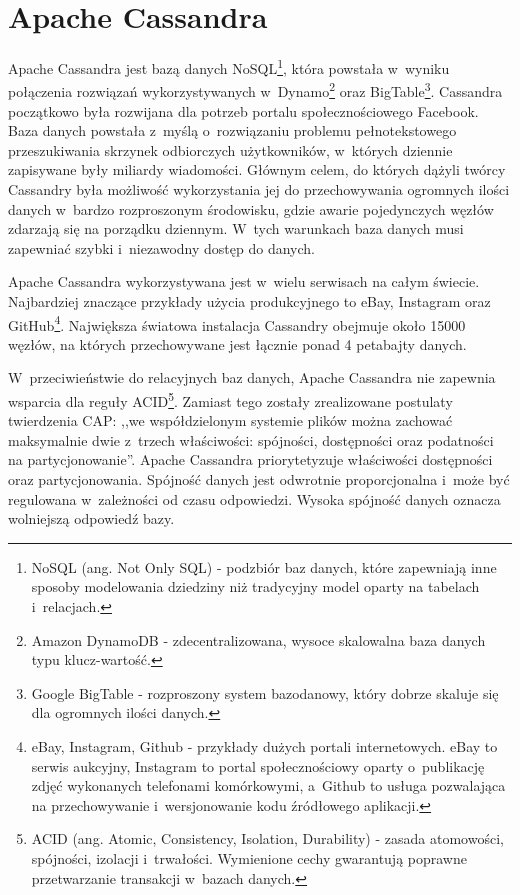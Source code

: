 
\chapter{Apache Cassandra}
\label{chap:apache_cassandra}

Apache Cassandra jest bazą danych NoSQL\footnote{NoSQL (ang. Not Only SQL) - podzbiór baz danych, które zapewniają inne sposoby modelowania dziedziny niż tradycyjny model oparty na tabelach i~relacjach.}, która powstała w~wyniku połączenia rozwiązań wykorzystywanych w~Dynamo\footnote{Amazon DynamoDB - zdecentralizowana, wysoce skalowalna baza danych typu klucz-wartość.} oraz BigTable\footnote{Google BigTable - rozproszony system bazodanowy, który dobrze skaluje się dla ogromnych ilości danych.}. Cassandra początkowo była rozwijana dla potrzeb portalu społecznościowego Facebook. Baza danych powstała z~myślą o~rozwiązaniu problemu pełnotekstowego przeszukiwania skrzynek odbiorczych użytkowników, w~których dziennie zapisywane były miliardy wiadomości. Głównym celem, do których dążyli twórcy Cassandry była możliwość wykorzystania jej do przechowywania ogromnych ilości danych w~bardzo rozproszonym środowisku, gdzie awarie pojedynczych węzłów zdarzają się na porządku dziennym. W~tych warunkach baza danych musi zapewniać szybki i~niezawodny dostęp do danych. \cite{cassandra_introduction} 

Apache Cassandra wykorzystywana jest w~wielu serwisach na całym świecie. Najbardziej znaczące przykłady użycia produkcyjnego to eBay, Instagram oraz GitHub\footnote{eBay, Instagram, Github - przykłady dużych portali internetowych. eBay to serwis aukcyjny, Instagram to portal społecznościowy oparty o~publikację zdjęć wykonanych telefonami komórkowymi, a~Github to usługa pozwalająca na przechowywanie i~wersjonowanie kodu źródłowego aplikacji.}. Największa światowa instalacja Cassandry obejmuje około 15000 węzłów, na których przechowywane jest łącznie ponad 4 petabajty danych. \cite{official_cassandra}

W~przeciwieństwie do relacyjnych baz danych, Apache Cassandra nie zapewnia wsparcia dla reguły ACID\footnote{ACID (ang. Atomic, Consistency, Isolation, Durability) - zasada atomowości, spójności, izolacji i~trwałości. Wymienione cechy gwarantują poprawne przetwarzanie transakcji w~bazach danych.}. Zamiast tego zostały zrealizowane postulaty twierdzenia CAP: ,,we współdzielonym systemie plików można zachować maksymalnie dwie z~trzech właściwości: spójności, dostępności oraz podatności na partycjonowanie''. \cite{cap_theorem} Apache Cassandra priorytetyzuje właściwości dostępności oraz partycjonowania. Spójność danych jest odwrotnie proporcjonalna i~może być regulowana w~zależności od czasu odpowiedzi. Wysoka spójność danych oznacza wolniejszą odpowiedź bazy.

